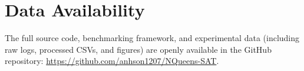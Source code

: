 \documentclass[a4paper,fleqn]{cas-sc}
\begin{document}
\maketitle










\section*{Data Availability}
The full source code, benchmarking framework, and experimental data (including raw logs, processed CSVs, and figures) are openly available in the GitHub repository: \url{https://github.com/anhson1207/NQueens-SAT}.



\end{document}

